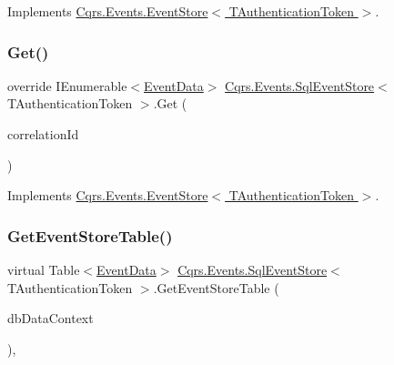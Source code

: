 Implements \hyperlink{classCqrs_1_1Events_1_1EventStore_aa1d0d399a35c1e3b0759e27202695d8b}{Cqrs.\+Events.\+Event\+Store$<$ T\+Authentication\+Token $>$}.

\mbox{\label{classCqrs_1_1Events_1_1SqlEventStore_ac1fb2bdec07cbeec57fb3d985e7a8b31}} 
\subsubsection{\texorpdfstring{Get()}{Get()}\hspace{0.1cm}{\footnotesize\ttfamily [2/2]}}
{\footnotesize\ttfamily override I\+Enumerable$<$\hyperlink{classCqrs_1_1Events_1_1EventData}{Event\+Data}$>$ \hyperlink{classCqrs_1_1Events_1_1SqlEventStore}{Cqrs.\+Events.\+Sql\+Event\+Store}$<$ T\+Authentication\+Token $>$.Get (\begin{DoxyParamCaption}\item[{Guid}]{correlation\+Id }\end{DoxyParamCaption})\hspace{0.3cm}{\ttfamily [virtual]}}



Implements \hyperlink{classCqrs_1_1Events_1_1EventStore_a0096646f5dff730b0041b9469719c420}{Cqrs.\+Events.\+Event\+Store$<$ T\+Authentication\+Token $>$}.

\mbox{\label{classCqrs_1_1Events_1_1SqlEventStore_a6daa6c32874ab593d0d8a54c90d219c6}} 
\subsubsection{\texorpdfstring{Get\+Event\+Store\+Table()}{GetEventStoreTable()}}
{\footnotesize\ttfamily virtual Table$<$\hyperlink{classCqrs_1_1Events_1_1EventData}{Event\+Data}$>$ \hyperlink{classCqrs_1_1Events_1_1SqlEventStore}{Cqrs.\+Events.\+Sql\+Event\+Store}$<$ T\+Authentication\+Token $>$.Get\+Event\+Store\+Table (\begin{DoxyParamCaption}\item[{Data\+Context}]{db\+Data\+Context }\end{DoxyParamCaption})\hspace{0.3cm}{\ttfamily [protected]}, {\ttfamily [virtual]}}

